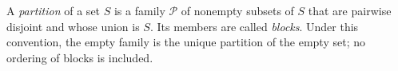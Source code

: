 
A \emph{partition} of a set $S$ is a family $\mathcal P$ of nonempty subsets of $S$ that are pairwise disjoint and whose union is $S$. Its members are called \emph{blocks}. Under this convention, the empty family is the unique partition of the empty set; no ordering of blocks is included.
